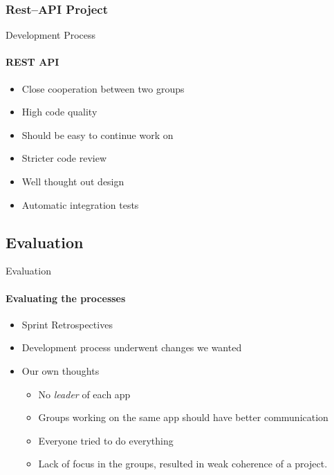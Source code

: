	\subsubsection{Rest--API Project}
		\begin{frame}[t]{Development Process}\framesubtitle{REST API}
	
    \begin{itemize}
        \item Close cooperation between two groups
        \item High code quality
        \item Should be easy to continue work on
        \item Stricter code review
        \item Well thought out design
        \item Automatic integration tests
    \end{itemize}
	\end{frame}

	\subsection{Evaluation}
		\begin{frame}[t]{Evaluation}\framesubtitle{Evaluating the processes}
	
    \begin{itemize}
        \item Sprint Retrospectives
        \item Development process underwent changes we wanted
        \item Our own thoughts
        	\begin{itemize}
        		\item No \textit{leader} of each app
        		\item Groups working on the same app should have better communication
        		\item Everyone tried to do everything
        		\item Lack of focus in the groups, resulted in weak coherence of a project.
        	\end{itemize}
    \end{itemize}
	\end{frame}